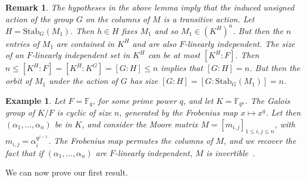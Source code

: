 \documentclass[12pt]{article}
\theoremstyle{plain}
\newtheorem{example}[theorem]{Example}
\newtheorem*{remark}{Remark}
\newcommand{\F}{\ensuremath{\mathbb{F}}}
\begin{document}
\begin{remark}
The hypotheses in the above lemma imply that the induced unsigned
action of the group $G$ on the columns of $M$ is a transitive action.
Let $H=\mathrm{Stab}_G(M_1)$. Then $h\in H$ fixes $M_1$ and so $M_1\in
(K^H)^n$.  But then the $n$ entries of $M_1$ are contained in $K^H$
and are also $F$-linearly independent.  The size of an $F$-linearly
independent set in $K^H$ can be at most $[K^H:F]$.  Then $n\le
[K^H:F]=[K^H:K^G]=[G:H]\le n$ implies that $[G:H]=n$.  But then the
orbit of $M_1$ under the action of $G$ has size
$[G:H]=[G:\mathrm{Stab}_G(M_1)]=n$.
\end{remark}  

\begin{example}\label{ex:Moore}
  Let $F=\F_q$, for some prime power $q$, and let $K=\F_{q^n}$.  The
  Galois group of $K/F$ is cyclic of size $n$, generated by the Frobenius
  map $x \mapsto x^q$. Let then $(\alpha_1,\dots,\alpha_n)$ be in $K$,
  and consider the {\em Moore matrix} $M=[m_{i,j}]_{1 \le i,j \le n}$, with
  $m_{i,j} = \alpha_i^{q^{j-1}}$. The Frobenius map permutes the
  columns of $M$, and we recover the fact that if
  $(\alpha_1,\dots,\alpha_n)$ are $F$-linearly independent, $M$ is
  invertible~\cite[Corollary~1.3.4]{Goss}.
\end{example}


We can now prove our first result.
\end{document}

